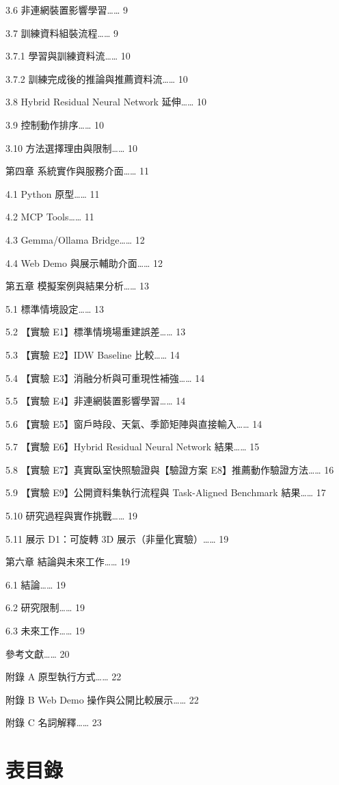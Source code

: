 \documentclass[12pt,a4paper]{article}
\begin{document}
  3.6 非連網裝置影響學習…… 9


  3.7 訓練資料組裝流程…… 9


    3.7.1 學習與訓練資料流…… 10


    3.7.2 訓練完成後的推論與推薦資料流…… 10


  3.8 Hybrid Residual Neural Network 延伸…… 10


  3.9 控制動作排序…… 10


  3.10 方法選擇理由與限制…… 10


第四章 系統實作與服務介面…… 11


  4.1 Python 原型…… 11


  4.2 MCP Tools…… 11


  4.3 Gemma/Ollama Bridge…… 12


  4.4 Web Demo 與展示輔助介面…… 12


第五章 模擬案例與結果分析…… 13


  5.1 標準情境設定…… 13


  5.2 【實驗 E1】標準情境場重建誤差…… 13


  5.3 【實驗 E2】IDW Baseline 比較…… 14


  5.4 【實驗 E3】消融分析與可重現性補強…… 14


  5.5 【實驗 E4】非連網裝置影響學習…… 14


  5.6 【實驗 E5】窗戶時段、天氣、季節矩陣與直接輸入…… 14


  5.7 【實驗 E6】Hybrid Residual Neural Network 結果…… 15


  5.8 【實驗 E7】真實臥室快照驗證與【驗證方案 E8】推薦動作驗證方法…… 16


  5.9 【實驗 E9】公開資料集執行流程與 Task-Aligned Benchmark 結果…… 17


  5.10 研究過程與實作挑戰…… 19


  5.11 展示 D1：可旋轉 3D 展示（非量化實驗）…… 19


第六章 結論與未來工作…… 19


  6.1 結論…… 19


  6.2 研究限制…… 19


  6.3 未來工作…… 19


參考文獻…… 20


附錄 A 原型執行方式…… 22


附錄 B Web Demo 操作與公開比較展示…… 22


附錄 C 名詞解釋…… 23


\clearpage

\section*{表目錄}
\end{document}
